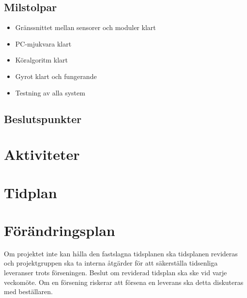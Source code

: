 \documentclass[a4paper,11pt]{article}
\begin{document}
\subsection{Milstolpar}
\begin{itemize}
	\item Gränssnittet mellan sensorer och moduler klart
	\item PC-mjukvara klart
	\item Köralgoritm klart
	\item Gyrot klart och fungerande
	\item Testning av alla system
\end{itemize}

\subsection{Beslutspunkter}
\begin{flushleft}
\begin{LIPSbeslutspunkter}
\end{LIPSbeslutspunkter}
\end{flushleft}

\section{Aktiviteter}

\section{Tidplan}

\section{Förändringsplan}
Om projektet inte kan hålla den fastslagna tidsplanen ska tidsplanen revideras och projektgruppen ska ta interna åtgärder för att säkerställa tidsenliga leveranser trots förseningen. Beslut om reviderad tidsplan ska ske vid varje veckomöte. Om en försening riskerar att försena en leverans ska detta diskuteras med beställaren.
\end{document}
